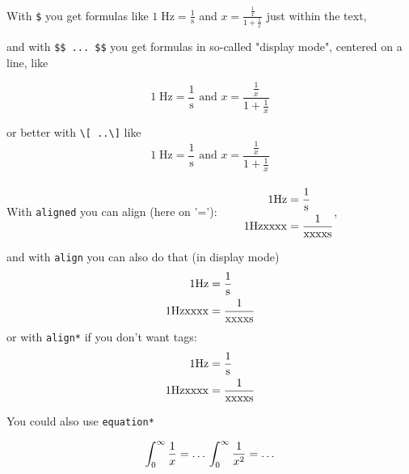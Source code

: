 \documentclass{ximera}
\begin{document}

With \verb|$| you get formulas like 
$1\;\textrm{Hz}=\frac{1}{\textrm{s}}$ and $ x =\frac{\frac1x}{1+\frac{1}{x}}$
just within the text,

and with \verb|$$ ... $$| you get formulas in so-called "display mode", centered on a line, like

$$
1\;\textrm{Hz}=\frac{1}{\textrm{s}} \text{ and } x =\frac{\frac1x}{1+\frac{1}{x}}
$$ 

or better with \verb|\[ ..\]|  like
\[
1\;\textrm{Hz}=\frac{1}{\textrm{s}} \text{ and } x =\frac{\frac1x}{1+\frac{1}{x}}
\] 
\\[1cm]
With \verb|aligned| you can align (here on '='):
$
\begin{aligned}
    \qquad 1 {\rm Hz}      & = \frac{1}{{\rm s}} \\
    \qquad 1 {\rm Hzxxxx}  & = \frac{1}{{\rm xxxxs}}
\end{aligned}
$,

and with \verb|align| you can also do that (in display mode)
\begin{align}
    1 {\rm Hz}      & = \frac{1}{{\rm s}} \\
    1 {\rm Hzxxxx}  & = \frac{1}{{\rm xxxxs}} \\
\end{align}
or with \verb|align*| if you don't want tags:
\begin{align*}
    1 {\rm Hz}      & = \frac{1}{{\rm s}} \\
    1 {\rm Hzxxxx}  & = \frac{1}{{\rm xxxxs}} \\
\end{align*}


You could also use \verb|equation*|

\begin{equation*}
    \int_0^\infty \frac{1}{x}  =  \ldots \\
    \int_0^\infty \frac{1}{x^2}  =  \ldots 
\end{equation*}

\end{document}
